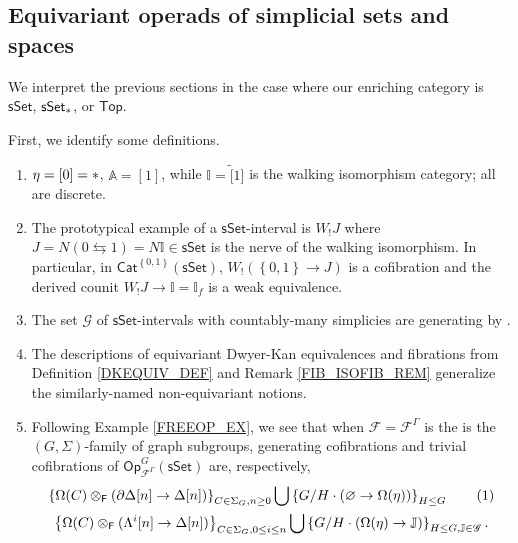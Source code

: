 \documentclass[a4paper,10pt
,draft
]{article}%
\numberwithin{equation}{section}
\numberwithin{figure}{section}
\theoremstyle{definition} %
\newcommand{\set}[1]{\left\{#1\right\}}%
\newcommand{\Fin}{\mathsf{F}}%
\newcommand{\Top}{\ensuremath{\mathsf{Top}}}
\newcommand{\sSet}{\ensuremath{\mathsf{sSet}}}%
\newcommand{\Cat}{\mathsf{Cat}}
\newcommand{\Op}{\mathsf{Op}}%
\newcommand{\F}{\ensuremath{\mathcal F}}
\newcommand{\I}{\mathbb I}
\newcommand{\1}{\ensuremath{\mathbbm 1}}%
\begin{document}
\subsection{Equivariant operads of simplicial sets and spaces}
\label{SSETMS_SEC}

We interpret the previous sections in the case where our enriching category is $\sSet$, $\sSet_{\**}$, or $\Top$.

First, we identify some definitions.
\begin{enumerate}[label = (\roman*)]
\item $\eta = [0] = \**$, $\mathbb A = [1]$, while $\mathbb I = \tilde [1]$ is the walking isomorphism category; all are discrete.
\item  The prototypical example of a $\sSet$-interval is $W_!J$ where $J = N(0 \leftrightarrows 1) = N \I \in \sSet$ is the nerve of the walking isomorphism.
      In particular, in $\Cat^{\set{0,1}}(\sSet)$,
      $W_!(\set{0,1} \to J)$ is a cofibration and
      the derived counit $W_!J \to \I = \I_f$ is a weak equivalence.
\item The set $\mathscr G$ of $\sSet$-intervals with countably-many simplicies are generating by \cite[Lemmas 4.2,4.3]{Ber07b}.
\item The descriptions of equivariant Dwyer-Kan equivalences and fibrations from Definition \ref{DKEQUIV_DEF} and Remark \ref{FIB_ISOFIB_REM} generalize the similarly-named non-equivariant notions.
\item Following Example \ref{FREEOP_EX}, we see that
      when $\F = \F^\Gamma$ is the is the $(G, \Sigma)$-family of graph subgroups,
      generating cofibrations and trivial cofibrations of $\Op^G_{\F^\Gamma}(\sSet)$ are, respectively, 
      \begin{gather*}
            \set{\Omega(C) \otimes_\Fin(\partial \Delta[n] \to \Delta[n])}_{C \in \Sigma_G, n \geq 0} \bigcup 
            \set{G/H \cdot (\varnothing \to \Omega(\eta))}_{H \leq G}
            \stepcounter{equation}\tag{\theequation}\label{SSETGENCOF_EQ}
            \\
            \set{\Omega(C) \otimes_\Fin(\Lambda^i[n] \to \Delta[n])}_{C \in \Sigma_G, 0 \leq i \leq n} \bigcup
            \set{G/H \cdot (\Omega(\eta) \to \mathbb J)}_{H \leq G, \mathbb J \in \mathscr G}.
      \end{gather*}     
\end{enumerate}    
\end{document}
